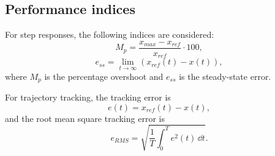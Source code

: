 \subsection{Performance indices}

For step responses, the following indices are considered:
\begin{equation}
    M_p = \frac{x_{max}-x_{ref}}{x_{ref}}\cdot 100,
\end{equation}
\begin{equation}
    e_{ss} = \lim_{t\to\infty} \left(x_{ref}(t)-x(t)\right),
\end{equation}
where $M_p$ is the percentage overshoot and $e_{ss}$ is the steady-state error.

For trajectory tracking, the tracking error is
\begin{equation}
    e(t) = x_{ref}(t)-x(t),
\end{equation}
and the root mean square tracking error is
\begin{equation}
    e_{RMS} = \sqrt{\frac{1}{T}\int_0^T e^2(t)\,\dd t}.
\end{equation}
